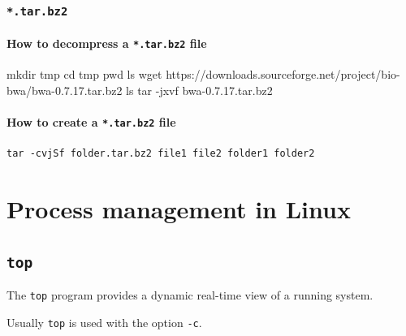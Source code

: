 \documentclass[]{book}
\makeatletter
\newenvironment{Shaded}{\begin{snugshade}}{\end{snugshade}}
\newcommand{\BuiltInTok}[1]{#1}
\newcommand{\FunctionTok}[1]{\textcolor[rgb]{0.00,0.00,0.00}{#1}}
\newcommand{\NormalTok}[1]{#1}
\newenvironment{kframe}{%
\medskip{}
\setlength{\fboxsep}{.8em}
 \def\at@end@of@kframe{}%
 \ifinner\ifhmode%
  \def\at@end@of@kframe{\end{minipage}}%
  \begin{minipage}{\columnwidth}%
 \fi\fi%
 \def\FrameCommand##1{\hskip\@totalleftmargin \hskip-\fboxsep
 \colorbox{shadecolor}{##1}\hskip-\fboxsep
     \hskip-\linewidth \hskip-\@totalleftmargin \hskip\columnwidth}%
 \MakeFramed {\advance\hsize-\width
   \@totalleftmargin\z@ \linewidth\hsize
   \@setminipage}}%
 {\par\unskip\endMakeFramed%
 \at@end@of@kframe}
\renewenvironment{Shaded}{\begin{kframe}}{\end{kframe}}
\makeatother
\begin{document}
\hypertarget{tar.bz2}{%
\subsection{\texorpdfstring{\texttt{*.tar.bz2}}{*.tar.bz2}}\label{tar.bz2}}

\hypertarget{how-to-decompress-a-.tar.bz2-file}{%
\subsubsection{\texorpdfstring{How to decompress a \texttt{*.tar.bz2} file}{How to decompress a *.tar.bz2 file}}\label{how-to-decompress-a-.tar.bz2-file}}

\begin{Shaded}
\begin{Highlighting}[]
\FunctionTok{mkdir}\NormalTok{ tmp}
\BuiltInTok{cd}\NormalTok{ tmp}
\BuiltInTok{pwd}
\FunctionTok{ls} 
\FunctionTok{wget}\NormalTok{ https://downloads.sourceforge.net/project/bio-bwa/bwa-0.7.17.tar.bz2}
\FunctionTok{ls}
\FunctionTok{tar}\NormalTok{ -jxvf bwa-0.7.17.tar.bz2}
\end{Highlighting}
\end{Shaded}

\hypertarget{how-to-create-a-.tar.bz2-file}{%
\subsubsection{\texorpdfstring{How to create a \texttt{*.tar.bz2} file}{How to create a *.tar.bz2 file}}\label{how-to-create-a-.tar.bz2-file}}

\begin{verbatim}
tar -cvjSf folder.tar.bz2 file1 file2 folder1 folder2
\end{verbatim}

\hypertarget{process-management-in-linux}{%
\chapter{Process management in Linux}\label{process-management-in-linux}}

\hypertarget{top}{%
\section{\texorpdfstring{\texttt{top}}{top}}\label{top}}

The \texttt{top} program provides a dynamic real-time view of a running system.

Usually \texttt{top} is used with the option \texttt{-c}.
\end{document}
